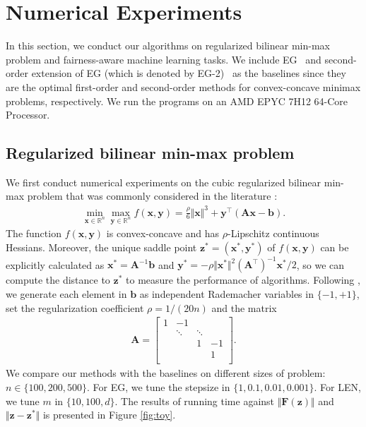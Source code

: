 \documentclass{article}
\def\vb{{\bm{b}}}
\def\vx{{\bm{x}}}
\def\vy{{\bm{y}}}
\def\vz{{\bm{z}}}
\def\mA{{\bm{A}}}
\def\mF{{\bm{F}}}
\def\sR{{\mathbb{R}}}
\theoremstyle{plain}
\begin{document}
\section{Numerical Experiments}
\label{sec:exp}
In this section, we conduct our algorithms on regularized bilinear min-max problem and fairness-aware machine learning tasks. We include EG~\citep{korpelevich1976extragradient} and second-order extension of EG (which is denoted by EG-2)~\citep{adil2022optimal,huang2022approximation,lin2022explicit} as the baselines since they are the optimal first-order and second-order methods for convex-concave minimax problems, respectively. 
We run the programs on an AMD EPYC 7H12 64-Core Processor.



\subsection{Regularized bilinear min-max problem}


We first conduct numerical experiments on the cubic regularized bilinear min-max problem that was commonly considered in the literature \citep{jiang2022generalized,lin2022explicit,jiang2024adaptive,adil2022optimal}:
\begin{align} \label{eq:cubic-toy}
    \min_{\vx \in \sR^n} \max_{\vy \in \sR^n} f(\vx,\vy) = \frac{\rho}{6} \Vert \vx \Vert^3  + \vy^\top (\mA \vx - \vb).
\end{align}
The function $f(\vx,\vy)$ is convex-concave and has $\rho$-Lipschitz continuous Hessians. Moreover, the unique saddle point $\vz^*= (\vx^*, \vy^*)$ of $f(\vx,\vy)$ can be explicitly calculated as  $\vx^* = \mA^{-1} \vb$ and $\vy^* = - \rho \Vert \vx^* \Vert^2 (\mA^\top)^{-1} \vx^* / 2$, so we can compute the distance to $\vz^*$ to measure the performance of algorithms.
Following \citet{lin2022explicit}, we generate each element in $\vb$ as independent Rademacher variables in $\{ -1, +1\}$, set the regularization coefficient $\rho = 1/(20n)$ and the matrix 
\begin{align*}
    \mA = 
    \begin{bmatrix}
        1 & -1 \\
& \ddots & \ddots \\
         & & 1 & -1 \\
         & & & 1 \\
        \end{bmatrix}.
\end{align*}
 We compare our methods with the baselines on different sizes of problem: $n \in \{100,200,500 \}$. For EG, we tune the stepsize in $ \{1, 0.1, 0.01, 0.001\}$. 
 For LEN, we tune $m$ in $\{10, 100, d \}$.
The results of running time against $\Vert \mF(\vz) \Vert$ and $\Vert \vz - \vz^* \Vert $ is presented in Figure \ref{fig:toy}. 
\end{document}
